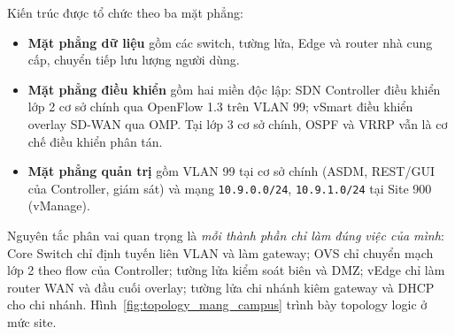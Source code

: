 Kiến trúc được tổ chức theo ba mặt phẳng:
\begin{itemize}
    \item \textbf{Mặt phẳng dữ liệu} gồm các switch, tường lửa, Edge và router nhà cung cấp, chuyển tiếp lưu lượng người dùng.
    \item \textbf{Mặt phẳng điều khiển} gồm hai miền độc lập: SDN Controller điều khiển lớp 2 cơ sở chính qua OpenFlow 1.3 trên VLAN 99; vSmart điều khiển overlay SD-WAN qua OMP. Tại lớp 3 cơ sở chính, OSPF và VRRP vẫn là cơ chế điều khiển phân tán.
    \item \textbf{Mặt phẳng quản trị} gồm VLAN 99 tại cơ sở chính (ASDM, REST/GUI của Controller, giám sát) và mạng \texttt{10.9.0.0/24}, \texttt{10.9.1.0/24} tại Site 900 (vManage).
\end{itemize}

Nguyên tắc phân vai quan trọng là \textit{mỗi thành phần chỉ làm đúng việc của mình}: Core Switch chỉ định tuyến liên VLAN và làm gateway; OVS chỉ chuyển mạch lớp 2 theo flow của Controller; tường lửa kiểm soát biên và DMZ; vEdge chỉ làm router WAN và đầu cuối overlay; tường lửa chi nhánh kiêm gateway và DHCP cho chi nhánh. Hình~\ref{fig:topology_mang_campus} trình bày topology logic ở mức site.

